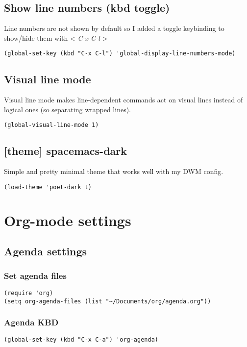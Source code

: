 \documentclass[11pt]{article}
\begin{document}
\subsection{Show line numbers (kbd toggle)}
\label{sec:org5a5afc6}
Line numbers are not shown by default so I added a toggle keybinding to show/hide them with < \emph{C-x C-l} >
\begin{verbatim}
(global-set-key (kbd "C-x C-l") 'global-display-line-numbers-mode)
\end{verbatim}

\subsection{Visual line mode}
\label{sec:org469a493}
Visual line mode makes line-dependent commands act on visual lines instead of logical ones (so separating wrapped lines). 
\begin{verbatim}
(global-visual-line-mode 1)
\end{verbatim}

\subsection{[theme] spacemacs-dark}
\label{sec:org868567c}
Simple and pretty minimal theme that works well with my DWM config.
\begin{verbatim}
(load-theme 'poet-dark t)
\end{verbatim}

\section{Org-mode settings}
\label{sec:org07508a5}
\subsection{Agenda settings}
\label{sec:org597b0dc}
\subsubsection{Set agenda files}
\label{sec:orgfd3857c}
\begin{verbatim}
(require 'org)
(setq org-agenda-files (list "~/Documents/org/agenda.org"))
\end{verbatim}

\subsubsection{Agenda KBD}
\label{sec:org36672bf}
\begin{verbatim}
(global-set-key (kbd "C-x C-a") 'org-agenda)
\end{verbatim}
\end{document}
